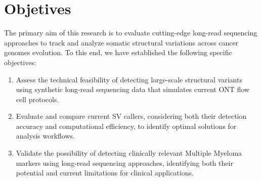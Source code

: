 \chapter{Objetives}

The primary aim of this research is to evaluate cutting-edge long-read 
sequencing approaches to track and analyze somatic structural variations across 
cancer genomes evolution. To this end, we have established the following 
specific objectives:

\begin{enumerate}

    \item Assess the technical feasibility of detecting large-scale structural 
    variants using synthetic long-read sequencing data that simulates current 
    ONT flow cell protocols.
    
    \item Evaluate and compare current SV callers, considering both their 
    detection accuracy and computational efficiency, to identify 
    optimal solutions for analysis workflows.
    
    \item Validate the possibility of detecting clinically relevant Multiple 
    Myeloma markers using long-read sequencing approaches, identifying both 
    their potential and current limitations for clinical applications.
    
\end{enumerate}



